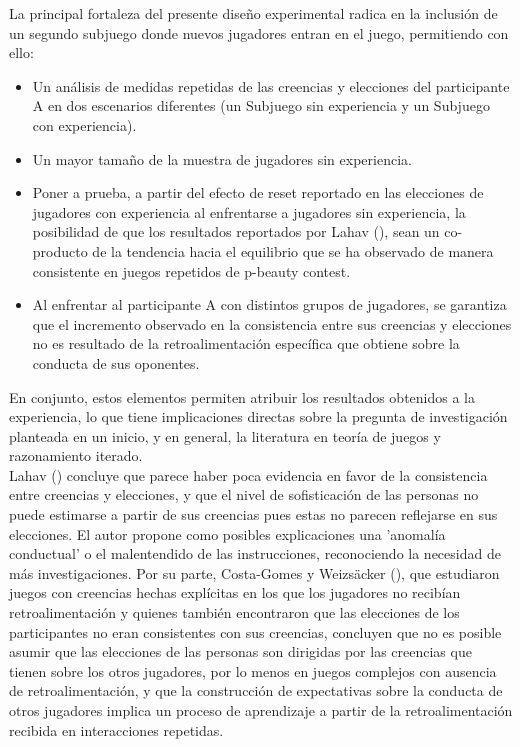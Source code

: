 La principal fortaleza del presente diseño experimental radica en la inclusión de un segundo subjuego donde nuevos jugadores entran en el juego, permitiendo con ello:\\

\begin{itemize}
\item Un análisis de medidas repetidas de las creencias y elecciones del participante A en dos escenarios diferentes (un Subjuego sin experiencia y un Subjuego con experiencia).\\

\item Un mayor tamaño de la muestra de jugadores sin experiencia.\\

\item Poner a prueba, a partir del efecto de reset reportado en las elecciones de jugadores con experiencia al enfrentarse a jugadores sin experiencia, la posibilidad de que los resultados reportados por Lahav (\citeyear{Lahav}), sean un co-producto de la tendencia hacia el equilibrio que se ha observado de manera consistente en juegos repetidos de p-beauty contest.\\

\item Al enfrentar al participante A con distintos grupos de jugadores, se garantiza que el incremento observado en la consistencia entre sus creencias y elecciones no es resultado de la retroalimentación específica que obtiene sobre la conducta de sus oponentes.\\
\end{itemize}

En conjunto, estos elementos permiten atribuir los resultados obtenidos a la experiencia, lo que tiene implicaciones directas sobre la pregunta de investigación planteada en un inicio, y en general, la literatura en teoría de juegos y razonamiento iterado.\\

Lahav (\citeyear{Lahav}) concluye que parece haber poca evidencia en favor de la consistencia entre creencias y elecciones, y que el nivel de sofisticación de las personas no puede estimarse a partir de sus creencias pues estas no parecen reflejarse en sus elecciones. El autor propone como posibles explicaciones una 'anomalía conductual' o el malentendido de las instrucciones, reconociendo la necesidad de más investigaciones. Por su parte, Costa-Gomes y Weizsäcker (\citeyear{Costa-Gomes}), que estudiaron juegos con creencias hechas explícitas en los que los jugadores no recibían retroalimentación y quienes también encontraron que las elecciones de los participantes no eran consistentes con sus creencias, concluyen que no es posible asumir que las elecciones de las personas son dirigidas por las creencias que tienen sobre los otros jugadores, por lo menos en juegos complejos con ausencia de retroalimentación, y que la construcción de expectativas sobre la conducta de otros jugadores implica un proceso de aprendizaje a partir de la retroalimentación recibida en interacciones repetidas.\\

